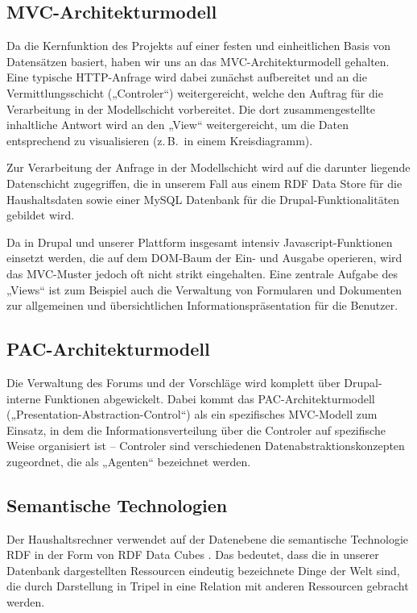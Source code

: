 \documentclass[a4paper,11pt,twoside]{article}
\begin{document}
\subsection{MVC-Architekturmodell}
Da die Kernfunktion des Projekts auf einer festen und einheitlichen Basis von
Datensätzen basiert, haben wir uns an das MVC-Architekturmodell \cite{MVC}
gehalten.  Eine typische HTTP-Anfrage wird dabei zunächst aufbereitet und an
die Vermittlungsschicht („Controler“) weitergereicht, welche den Auftrag für
die Verarbeitung in der Modellschicht vorbereitet. Die dort zusammengestellte
inhaltliche Antwort wird an den „View“ weitergereicht, um die Daten
entsprechend zu visualisieren (z.\,B.\ in einem Kreisdiagramm).

Zur Verarbeitung der Anfrage in der Modellschicht wird auf die darunter
liegende Datenschicht zugegriffen, die in unserem Fall aus einem RDF Data
Store für die Haushaltsdaten sowie einer MySQL Datenbank für die
Drupal-Funktionalitäten gebildet wird. 

Da in Drupal und unserer Plattform insgesamt intensiv Javascript-Funktionen
einsetzt werden, die auf dem DOM-Baum der Ein- und Ausgabe operieren, wird das
MVC-Muster jedoch oft nicht strikt eingehalten. Eine zentrale Aufgabe des
„Views“ ist zum Beispiel auch die Verwaltung von Formularen und Dokumenten zur
allgemeinen und übersichtlichen Informationspräsentation für die Benutzer.

\subsection{PAC-Architekturmodell}
Die Verwaltung des Forums und der Vorschläge wird komplett über Drupal-interne
Funktionen abgewickelt. Dabei kommt das PAC-Architekturmodell \cite{PAC} 
(„Presentation-Abstraction-Control“) als ein spezifisches MVC-Modell zum
Einsatz, in dem die Informationsverteilung über die Controler auf spezifische
Weise organisiert ist -- Controler sind verschiedenen
Datenabstraktionskonzepten zugeordnet, die als „Agenten“ bezeichnet werden.

\subsection{Semantische Technologien}
Der Haushaltsrechner verwendet auf der Datenebene die semantische Technologie
RDF \cite{RDF} in der Form von RDF Data Cubes \cite{RDFCube}. Das bedeutet,
dass die in unserer Datenbank dargestellten Ressourcen eindeutig bezeichnete
Dinge der Welt sind, die durch Darstellung in Tripel in eine Relation mit
anderen Ressourcen gebracht werden.
\end{document}
